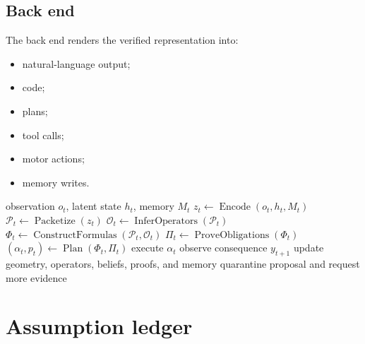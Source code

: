 \documentclass[11pt]{article}
\theoremstyle{definition}
\theoremstyle{remark}
\begin{document}
\subsection{Back end}

The back end renders the verified representation into:
\begin{itemize}[leftmargin=1.6em]
  \item natural-language output;
  \item code;
  \item plans;
  \item tool calls;
  \item motor actions;
  \item memory writes.
\end{itemize}

\begin{algorithm}[ht]
\caption{Operator-symbolic execution cycle}
\label{alg:cycle}
\begin{algorithmic}[1]
\Require observation \(o_t\), latent state \(h_t\), memory \(M_t\)
\State \(z_t\gets\operatorname{Encode}(o_t,h_t,M_t)\)
\State \(\mathcal P_t\gets\operatorname{Packetize}(z_t)\)
\State \(\mathcal O_t\gets\operatorname{InferOperators}(\mathcal P_t)\)
\State \(\Phi_t\gets\operatorname{ConstructFormulas}(\mathcal P_t,\mathcal O_t)\)
\State \(\Pi_t\gets\operatorname{ProveObligations}(\Phi_t)\)
\State \((\alpha_t,p_t)\gets\operatorname{Plan}(\Phi_t,\Pi_t)\)
  \State execute \(\alpha_t\)
  \State observe consequence \(y_{t+1}\)
  \State update geometry, operators, beliefs, proofs, and memory
\Else
  \State quarantine proposal and request more evidence
\EndIf
\end{algorithmic}
\end{algorithm}

\section{Assumption ledger}
\end{document}
